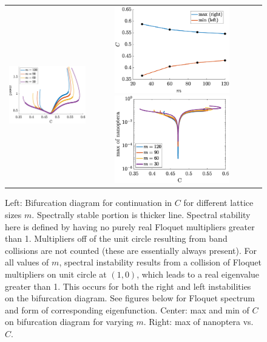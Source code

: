 \documentclass{article}
\begin{document}
\begin{figure}[H]
    \centering
    \begin{tabular}{ccc}
    \includegraphics[width=5cm]{leftBD1} &
    \includegraphics[width=5cm]{leftmaxminC} 
    \includegraphics[width=5cm]{leftBDnanop} 
    \end{tabular}
    \caption{Left: Bifurcation diagram for continuation in $C$ for different lattice sizes $m$. Spectrally stable portion is thicker line. Spectral stability here is defined by having no purely real Floquet multipliers greater than 1. Multipliers off of the unit circle resulting from band collisions are not counted (these are essentially always present). For all values of $m$, spectral instability results from a collision of Floquet multipliers on unit circle at $(1,0)$, which leads to a real eigenvalue greater than 1. This occurs for both the right and left instabilities on the bifurcation diagram. See figures below for Floquet spectrum and form of corresponding eigenfunction.
    Center: max and min of $C$ on bifurcation diagram for varying $m$. 
    Right: max of nanoptera vs. $C$.}
    \label{fig:left2}
\end{figure}
\end{document}
